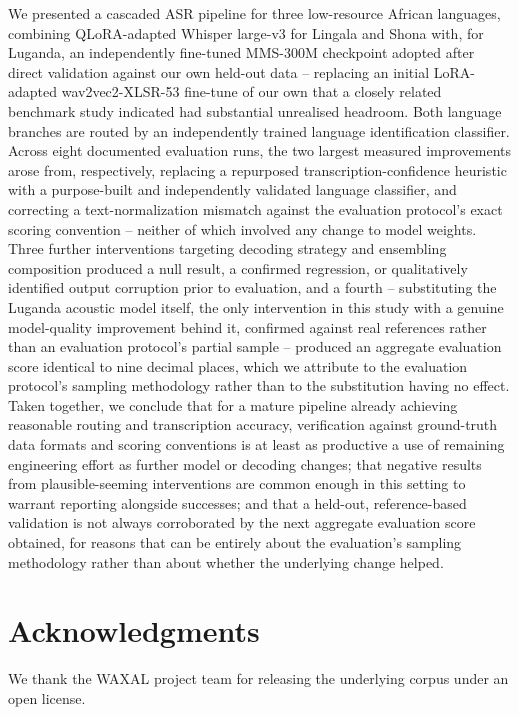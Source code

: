 \documentclass[11pt]{article}
\begin{document}
We presented a cascaded ASR pipeline for three low-resource African languages, combining QLoRA-adapted Whisper large-v3 for Lingala and Shona with, for Luganda, an independently fine-tuned MMS-300M checkpoint adopted after direct validation against our own held-out data -- replacing an initial LoRA-adapted wav2vec2-XLSR-53 fine-tune of our own that a closely related benchmark study indicated had substantial unrealised headroom. Both language branches are routed by an independently trained language identification classifier. Across eight documented evaluation runs, the two largest measured improvements arose from, respectively, replacing a repurposed transcription-confidence heuristic with a purpose-built and independently validated language classifier, and correcting a text-normalization mismatch against the evaluation protocol's exact scoring convention -- neither of which involved any change to model weights. Three further interventions targeting decoding strategy and ensembling composition produced a null result, a confirmed regression, or qualitatively identified output corruption prior to evaluation, and a fourth -- substituting the Luganda acoustic model itself, the only intervention in this study with a genuine model-quality improvement behind it, confirmed against real references rather than an evaluation protocol's partial sample -- produced an aggregate evaluation score identical to nine decimal places, which we attribute to the evaluation protocol's sampling methodology rather than to the substitution having no effect. Taken together, we conclude that for a mature pipeline already achieving reasonable routing and transcription accuracy, verification against ground-truth data formats and scoring conventions is at least as productive a use of remaining engineering effort as further model or decoding changes; that negative results from plausible-seeming interventions are common enough in this setting to warrant reporting alongside successes; and that a held-out, reference-based validation is not always corroborated by the next aggregate evaluation score obtained, for reasons that can be entirely about the evaluation's sampling methodology rather than about whether the underlying change helped.

\section*{Acknowledgments}
We thank the WAXAL project team for releasing the underlying corpus under an open license.
\end{document}
